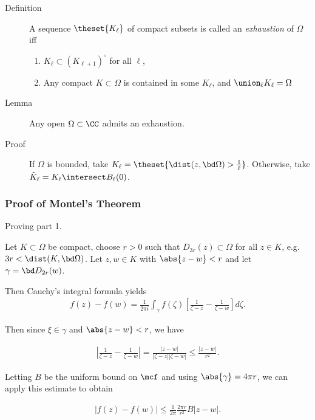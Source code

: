\begin{description}
\item[Definition]
A sequence \(\theset{K_\ell}\) of compact subsets is called an
\emph{exhaustion} of \(\Omega\) iff

\begin{enumerate}
\def\labelenumi{\arabic{enumi}.}
\tightlist
\item
  \(K_\ell \subset (K_{\ell+1})^\circ\) for all \(\ell\),
\item
  Any compact \(K\subset \Omega\) is contained in some \(K_\ell\), and
  \(\union_\ell K_\ell = \Omega\)
\end{enumerate}
\item[Lemma]
Any open \(\Omega \subset \CC\) admits an exhaustion.
\item[Proof]
If \(\Omega\) is bounded, take
\(K_\ell = \theset{\dist(z, \bd \Omega) > \frac 1 \ell}\). Otherwise,
take \(\tilde K_\ell = K_\ell \intersect B_\ell(0)\).
\end{description}

\hypertarget{proof-of-montels-theorem}{%
\subsubsection{Proof of Montel's
Theorem}\label{proof-of-montels-theorem}}

Proving part 1.

Let \(K \subset \Omega\) be compact, choose \(r> 0\) such that
\(D_{3r}(z) \subset \Omega\) for all \(z\in K\),
e.g.~\(3r < \dist(K, \bd \Omega)\). Let \(z, w\in K\) with
\(\abs{z-w} < r\) and let \(\gamma = \bd D_{2r}(w)\).

Then Cauchy's integral formula yields \begin{align*}
  f(z)-f(w)=\frac{1}{2 \pi i} \int_{\gamma} f(\zeta)\left[\frac{1}{\zeta-z}-\frac{1}{\zeta-w}\right] d \zeta
.\end{align*}

Then since \(\xi \in \gamma\) and \(\abs{z-w} < r\), we have

\begin{align*}
  \left|\frac{1}{\zeta-z}-\frac{1}{\zeta-w}\right|=\frac{|z-w|}{|\zeta-z||\zeta-w|} \leq \frac{|z-w|}{r^{2}}
.\end{align*}

Letting \(B\) be the uniform bound on \(\mcf\) and using
\(\abs{\gamma} = 4\pi r\), we can apply this estimate to obtain

\begin{align*}
  |f(z)-f(w)| \leq \frac{1}{2 \pi} \frac{2 \pi r}{r^{2}} B|z-w|
.\end{align*}

